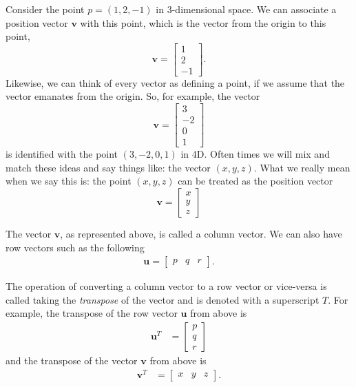 \begin{center}
\end{center}

Consider the point $p = (1,2,-1)$ in 3-dimensional space. We can associate a position vector $\mathbf{v}$ with this point, which is the vector from the origin to this point,
\[\mathbf{v} = \left[
\begin{array}{r}
1 \\
2 \\
-1
\end{array}\right].
\]
Likewise, we can think of every vector as defining a point, if we assume that the vector emanates from the origin. So, for example, the vector
\[\mathbf{v} = \left[
\begin{array}{r}
3 \\
-2 \\
0 \\
1
\end{array}\right]
\]
is identified with the point $(3,-2,0,1)$ in 4D. Often times we will mix and match these ideas and say things like: the vector $(x,y,z)$. What we really mean when we say this is: the point $(x,y,z)$ can be treated as the position vector
\[\mathbf{v} = \left[
\begin{array}{r}
x \\
y \\
z
\end{array}\right]
\]

The vector $\mathbf{v}$, as represented above, is called a column vector. We can also have row vectors such as the following
 \begin{align*}
 \mathbf{u} = \begin{bmatrix} p & q & r \end{bmatrix}.
 \end{align*}

The operation of converting a column vector to a row vector or vice-versa is called taking the \emph{transpose} of the vector and is denoted with a superscript $T$. For example, the transpose of the row vector $\mathbf{u}$ from above is
\begin{align}
\mathbf{u}^T &= \begin{bmatrix} p \\ q \\ r \end{bmatrix}
\end{align}
and the transpose of the vector $\mathbf{v}$ from above is 
\begin{align}
\mathbf{v}^T &= \begin{bmatrix} x & y & z \end{bmatrix}.
\end{align}

